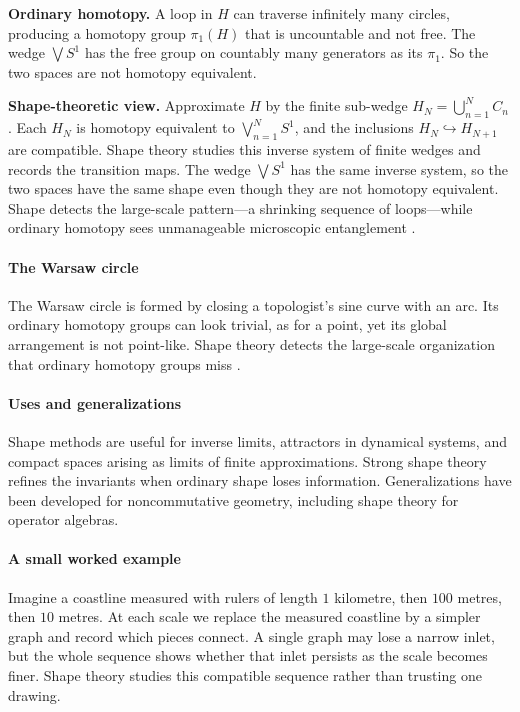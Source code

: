 \textbf{Ordinary homotopy.} A loop in $H$ can traverse infinitely many circles, producing a homotopy group $\pi_1(H)$ that is uncountable and not free. The wedge $\bigvee S^1$ has the free group on countably many generators as its $\pi_1$. So the two spaces are not homotopy equivalent.

\textbf{Shape-theoretic view.} Approximate $H$ by the finite sub-wedge $H_N=\bigcup_{n=1}^{N}C_n$. Each $H_N$ is homotopy equivalent to $\bigvee_{n=1}^{N}S^1$, and the inclusions $H_N\hookrightarrow H_{N+1}$ are compatible. Shape theory studies this inverse system of finite wedges and records the transition maps. The wedge $\bigvee S^1$ has the same inverse system, so the two spaces have the same shape even though they are not homotopy equivalent. Shape detects the large-scale pattern---a shrinking sequence of loops---while ordinary homotopy sees unmanageable microscopic entanglement \cite{shape_ref1,shape_ref2}.

\paragraph{The Warsaw circle}
The Warsaw circle is formed by closing a topologist's sine curve with an arc. Its ordinary homotopy groups can look trivial, as for a point, yet its global arrangement is not point-like. Shape theory detects the large-scale organization that ordinary homotopy groups miss \cite{shape_ref1}.

\paragraph{Uses and generalizations}
Shape methods are useful for inverse limits, attractors in dynamical systems, and compact spaces arising as limits of finite approximations. Strong shape theory refines the invariants when ordinary shape loses information. Generalizations have been developed for noncommutative geometry, including shape theory for operator algebras.

\paragraph{A small worked example}
Imagine a coastline measured with rulers of length $1$ kilometre, then
$100$ metres, then $10$ metres. At each scale we replace the measured
coastline by a simpler graph and record which pieces connect. A single graph
may lose a narrow inlet, but the whole sequence shows whether that inlet
persists as the scale becomes finer. Shape theory studies this compatible
sequence rather than trusting one drawing.

